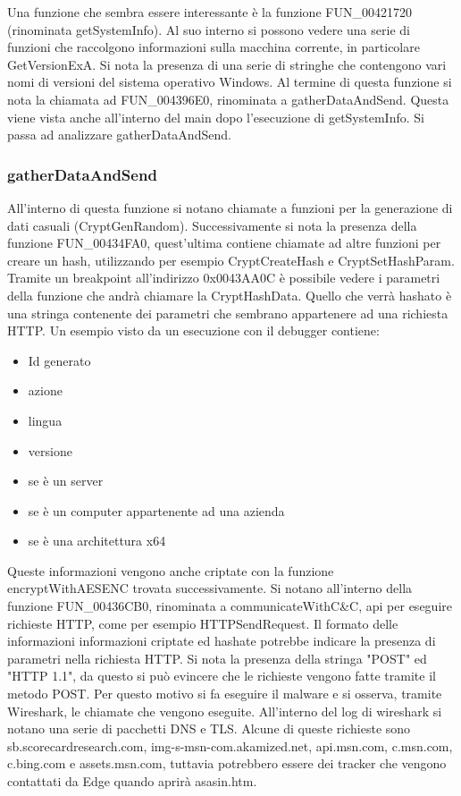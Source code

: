 \documentclass[a4paper,12pt]{article}
\begin{document}
Una funzione che sembra essere interessante è la funzione FUN\_00421720 (rinominata getSystemInfo). Al suo interno si possono vedere una serie di funzioni che raccolgono informazioni sulla macchina corrente, in particolare GetVersionExA. Si nota la presenza di una serie di stringhe che contengono vari nomi di versioni del sistema operativo Windows. Al termine di questa funzione si nota la chiamata ad FUN\_004396E0, rinominata a gatherDataAndSend. Questa viene vista anche all'interno del main dopo l'esecuzione di getSystemInfo. Si passa ad analizzare gatherDataAndSend.

\subsubsection{gatherDataAndSend}
All'interno di questa funzione si notano chiamate a funzioni per la generazione di dati casuali (CryptGenRandom). Successivamente si nota la presenza della funzione FUN\_00434FA0, quest'ultima contiene chiamate ad altre funzioni per creare un hash, utilizzando per esempio CryptCreateHash e CryptSetHashParam. Tramite un breakpoint all'indirizzo 0x0043AA0C è possibile vedere i parametri della funzione che andrà chiamare la CryptHashData. Quello che verrà hashato è una stringa contenente dei parametri che sembrano appartenere ad una richiesta HTTP. Un esempio visto da un esecuzione con il debugger contiene:
\begin{itemize}
	\item Id generato
	\item azione
	\item lingua
	\item versione
	\item se è un server
	\item se è un computer appartenente ad una azienda
	\item se è una architettura x64
\end{itemize}

Queste informazioni vengono anche criptate con la funzione encryptWithAESENC trovata successivamente.
Si notano all'interno della funzione FUN\_00436CB0, rinominata a communicateWithC\&C, api per eseguire richieste HTTP, come per esempio HTTPSendRequest. Il formato delle informazioni informazioni criptate ed hashate potrebbe indicare la presenza di parametri nella richiesta HTTP. Si nota la presenza della stringa "POST" ed "HTTP 1.1", da questo si può evincere che le richieste vengono fatte tramite il metodo POST.
Per questo motivo si fa eseguire il malware e si osserva, tramite Wireshark, le chiamate che vengono eseguite. All'interno del log di wireshark si notano una serie di pacchetti DNS e TLS.  Alcune di queste richieste sono sb.scorecardresearch.com, img-s-msn-com.akamized.net, api.msn.com, c.msn.com, c.bing.com e assets.msn.com, tuttavia potrebbero essere dei tracker che vengono contattati da Edge quando aprirà asasin.htm. 
\end{document}
